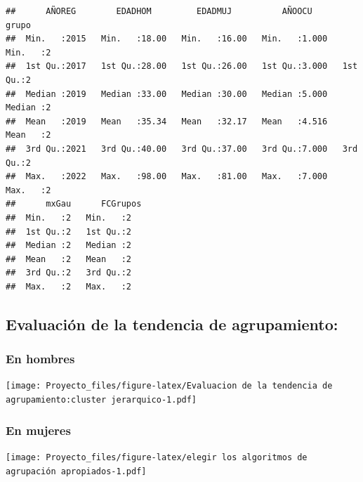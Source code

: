 \documentclass[
]{article}
\begin{document}
\begin{verbatim}
##      AÑOREG        EDADHOM         EDADMUJ          AÑOOCU          grupo  
##  Min.   :2015   Min.   :18.00   Min.   :16.00   Min.   :1.000   Min.   :2  
##  1st Qu.:2017   1st Qu.:28.00   1st Qu.:26.00   1st Qu.:3.000   1st Qu.:2  
##  Median :2019   Median :33.00   Median :30.00   Median :5.000   Median :2  
##  Mean   :2019   Mean   :35.34   Mean   :32.17   Mean   :4.516   Mean   :2  
##  3rd Qu.:2021   3rd Qu.:40.00   3rd Qu.:37.00   3rd Qu.:7.000   3rd Qu.:2  
##  Max.   :2022   Max.   :98.00   Max.   :81.00   Max.   :7.000   Max.   :2  
##      mxGau      FCGrupos
##  Min.   :2   Min.   :2  
##  1st Qu.:2   1st Qu.:2  
##  Median :2   Median :2  
##  Mean   :2   Mean   :2  
##  3rd Qu.:2   3rd Qu.:2  
##  Max.   :2   Max.   :2
\end{verbatim}

\hypertarget{evaluaciuxf3n-de-la-tendencia-de-agrupamiento}{%
\subsection{Evaluación de la tendencia de
agrupamiento:}\label{evaluaciuxf3n-de-la-tendencia-de-agrupamiento}}

\hypertarget{en-hombres}{%
\subsubsection{En hombres}\label{en-hombres}}

\texttt{[image: Proyecto\_files/figure-latex/Evaluacion de la tendencia de agrupamiento:cluster jerarquico-1.pdf]}

\hypertarget{en-mujeres}{%
\subsubsection{En mujeres}\label{en-mujeres}}

\texttt{[image: Proyecto\_files/figure-latex/elegir los algoritmos de agrupación apropiados-1.pdf]}
\end{document}
